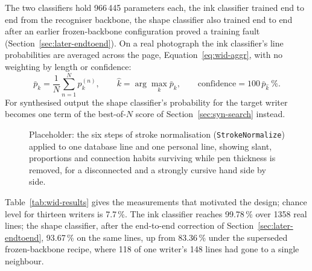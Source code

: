 The two classifiers hold 966\,445 parameters each, the ink classifier trained end to end from the recogniser backbone, the shape classifier also trained end to end after an earlier frozen-backbone configuration proved a training fault (Section~\ref{sec:later-endtoend}). On a real photograph the ink classifier's line probabilities are averaged across the page, Equation~\ref{eq:wid-aggr}, with no weighting by length or confidence:
\begin{equation}
\bar p_k=\frac1N\sum_{n=1}^Np^{(n)}_k,\qquad\hat k=\arg\max_k\bar p_k,\qquad\text{confidence}=100\,\bar p_{\hat k}\ \%.
\label{eq:wid-aggr}
\end{equation}
For synthesised output the shape classifier's probability for the target writer becomes one term of the best-of-$N$ score of Section~\ref{sec:syn-search} instead.

\begin{figure}[htb]
\centering
{}
\captionsetup{singlelinecheck=false,justification=justified}
\caption{Placeholder: the six steps of stroke normalisation (\texttt{StrokeNormalize}) applied to one database line and one personal line, showing slant, proportions and connection habits surviving while pen thickness is removed, for a disconnected and a strongly cursive hand side by side.}
\label{fig:wid-snorm-fig}
\end{figure}

Table~\ref{tab:wid-results} gives the measurements that motivated the design; chance level for thirteen writers is 7.7\,\%. The ink classifier reaches 99.78\,\% over 1358 real lines; the shape classifier, after the end-to-end correction of Section~\ref{sec:later-endtoend}, 93.67\,\% on the same lines, up from 83.36\,\% under the superseded frozen-backbone recipe, where 118 of one writer's 148 lines had gone to a single neighbour.

